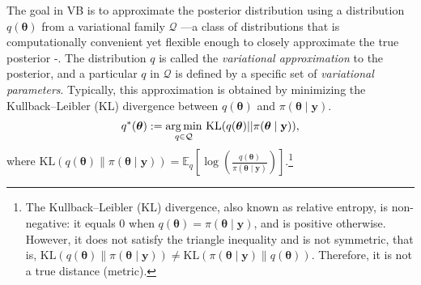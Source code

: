 The goal in VB is to approximate the posterior distribution using a distribution $q(\boldsymbol{\theta})$ from a variational family $\mathcal{Q}$ —a class of distributions that is computationally convenient yet flexible enough to closely approximate the true posterior \cite{blei2017variational}-. The distribution $q$ is called the \textit{variational approximation} to the posterior, and a particular $q$ in $\mathcal{Q}$ is defined by a specific set of \textit{variational parameters}. Typically, this approximation is obtained by minimizing the Kullback–Leibler (KL) divergence between $q(\boldsymbol{\theta})$ and $\pi(\boldsymbol{\theta} \mid \mathbf{y})$.
\begin{align}\label{eq:VB1}
	q^*(\boldsymbol{\theta}):=\underset{q \in \mathcal{Q}}{\argmin} \  \text{KL}(q(\boldsymbol{\theta})||\pi(\boldsymbol{\theta} \mid \mathbf{y})),
\end{align}  
where $\text{KL}(q(\boldsymbol{\theta}) \| \pi(\boldsymbol{\theta} \mid \mathbf{y})) = \mathbb{E}_q\left[\log\left(\frac{q(\boldsymbol{\theta})}{\pi(\boldsymbol{\theta} \mid \mathbf{y})}\right)\right]$.\footnote{The Kullback–Leibler (KL) divergence, also known as relative entropy, is non-negative: it equals 0 when $q(\boldsymbol{\theta}) = \pi(\boldsymbol{\theta} \mid \mathbf{y})$, and is positive otherwise. However, it does not satisfy the triangle inequality and is not symmetric, that is, $\text{KL}(q(\boldsymbol{\theta}) \| \pi(\boldsymbol{\theta} \mid \mathbf{y})) \neq \text{KL}(\pi(\boldsymbol{\theta} \mid \mathbf{y}) \| q(\boldsymbol{\theta}))$. Therefore, it is not a true distance (metric).}

